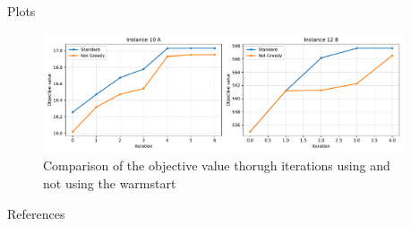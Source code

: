 \documentclass[final]{beamer}
\newlength{\sepwidth}
\newlength{\colwidth}
\newcommand{\separatorcolumn}{\begin{column}{\sepwidth}\end{column}}
\begin{document}
\begin{frame}[t]
\begin{columns}[t]
\begin{column}{\colwidth}
\begin{block}{Plots}
    \begin{figure}
      \includegraphics{greedy_cmp.pdf}
      \caption{Comparison of the objective value thorugh iterations using and not using the warmstart}
      \label{fig:greedy_cmp_obj_val}
    \end{figure}

  \end{block}

  \begin{block}{References}

    \nocite{*}
    \footnotesize{}

  \end{block}

\end{column}

\separatorcolumn
\end{columns}
\end{frame}
\end{document}
